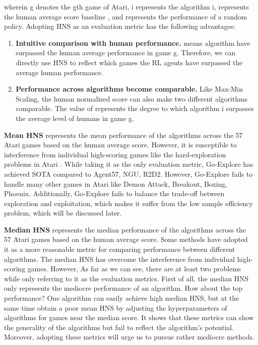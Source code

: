 \documentclass[nohyperref]{article}
\theoremstyle{plain}
\begin{document}
wherein g denotes the gth game of Atari, i represents the algorithm i,  represents the human average score baseline \citep{atarihuman}, and  represents the performance of a random policy. Adopting HNS as an evaluation metric has the following advantages:

\begin{enumerate}
    \item \textbf{Intuitive comparison with human performance.}  means algorithm  have surpassed the human average performance in game g. Therefore, we can directly use HNS to reflect which games the RL agents have surpassed the average human performance. 
    \item \textbf{Performance across algorithms become comparable.} Like Max-Min Scaling, the human normalized score can also make two different algorithms comparable. The value of  represents the degree to which algorithm i surpasses the average level of humans in game g.
\end{enumerate}

\textbf{Mean HNS} represents the mean performance of the algorithms across the 57 Atari games  based on the human average score. However, it is susceptible to interference from individual high-scoring games like the hard-exploration problems in Atari \citep{goexplore}. While taking it as the only evaluation metric, Go-Explore\citep{goexplore} has achieved SOTA compared to Agent57\citep{agent57}, NGU\citep{ngu}, R2D2\citep{r2d2}. However, Go-Explore fails to handle many other games in Atari like Demon Attack, Breakout, Boxing, Phoenix. Additionally, Go-Explore fails to balance the trade-off between exploration and exploitation, which makes it suffer from the low sample efficiency problem, which will be discussed later.

\textbf{Median HNS} represents the median performance of the algorithms across the 57 Atari games based on the human average score. Some methods \citep{muzero,muesli} have adopted it as a more reasonable metric for comparing performance between different algorithms. The median HNS has overcome the interference from individual high-scoring games. However, As far as we can see, there are at least two problems while only referring to it as the evaluation metrics. First of all, the median HNS only represents the mediocre performance of an algorithm. How about the top performance? One algorithm \citep{muesli} can easily achieve high median HNS, but at the same time obtain a poor mean HNS by adjusting the hyperparameters of algorithms for games near the median score. It shows that these metrics can show the generality of the algorithms but fail to reflect the algorithm's potential. Moreover, adopting these metrics will urge us to pursue rather mediocre methods.
\end{document}
